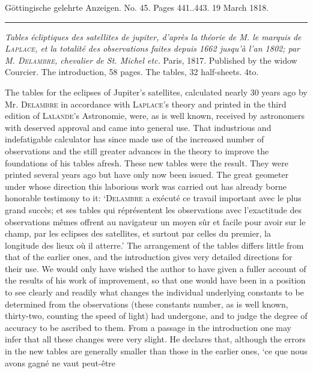 \clearpage
{}
\hypertarget{native-608-lower}{}
\begin{center}\small Göttingische gelehrte Anzeigen. No. 45. Pages 441..443. 19 March 1818.\\[3pt]\rule{.72\linewidth}{.3pt}\end{center}

\emph{Tables écliptiques des satellites de jupiter, d'après la théorie de M. le marquis de \textup{\textsc{Laplace}}, et la totalité des observations faites depuis \textup{1662} jusqu'à l'an \textup{1802}; par M. \textup{\textsc{Delambre}}, chevalier de St. Michel etc.} Paris, 1817. Published by the widow Courcier. The introduction, 58 pages. The tables, 32 half-sheets. 4to.

\begingroup{}\relax
The tables for the eclipses of Jupiter's satellites, calculated nearly 30 years ago by Mr. \textsc{Delambre} in accordance with \textsc{Laplace}'s theory and printed in the third edition of \textsc{Lalande}'s Astronomie, were, as is well known, received by astronomers with deserved approval and came into general use. That industrious and indefatigable calculator has since made use of the increased number of observations and the still greater advances in the theory to improve the foundations of his tables afresh. These new tables were the result. They were printed several years ago but have only now been issued. The great geometer under whose direction this laborious work was carried out has already borne honorable testimony to it: `\textsc{Delambre} a exécuté ce travail important avec le plus grand succès; et ses tables qui réprésentent les observations avec l'exactitude des observations mêmes offrent au navigateur un moyen sûr et facile pour avoir sur le champ, par les eclipses des satellites, et surtout par celles du premier, la longitude des lieux où il atterre.' The arrangement of the tables differs little from that of the earlier ones, and the introduction gives very detailed directions for their use. We would only have wished the author to have given a fuller account of the results of his work of improvement, so that one would have been in a position to see clearly and readily what changes the individual underlying constants to be determined from the observations (these constants number, as is well known, thirty-two, counting the speed of light) had undergone, and to judge the degree of accuracy to be ascribed to them. From a passage in the introduction one may infer that all these changes were very slight. He declares that, although the errors in the new tables are generally smaller than those in the earlier ones, `ce que nous avons gagné ne vaut peut-être
